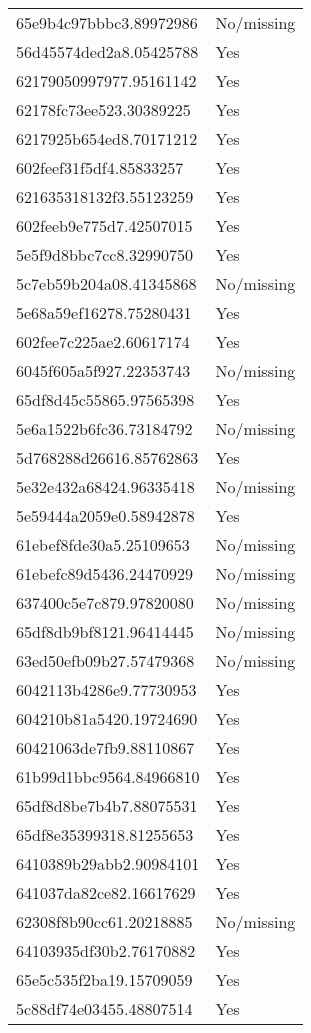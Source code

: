 \begin{tabular}{ll}
65e9b4c97bbbc3.89972986 & No/missing \\
56d45574ded2a8.05425788 & Yes \\
62179050997977.95161142 & Yes \\
62178fc73ee523.30389225 & Yes \\
6217925b654ed8.70171212 & Yes \\
602feef31f5df4.85833257 & Yes \\
621635318132f3.55123259 & Yes \\
602feeb9e775d7.42507015 & Yes \\
5e5f9d8bbc7cc8.32990750 & Yes \\
5c7eb59b204a08.41345868 & No/missing \\
5e68a59ef16278.75280431 & Yes \\
602fee7c225ae2.60617174 & Yes \\
6045f605a5f927.22353743 & No/missing \\
65df8d45c55865.97565398 & Yes \\
5e6a1522b6fc36.73184792 & No/missing \\
5d768288d26616.85762863 & Yes \\
5e32e432a68424.96335418 & No/missing \\
5e59444a2059e0.58942878 & Yes \\
61ebef8fde30a5.25109653 & No/missing \\
61ebefc89d5436.24470929 & No/missing \\
637400c5e7c879.97820080 & No/missing \\
65df8db9bf8121.96414445 & No/missing \\
63ed50efb09b27.57479368 & No/missing \\
6042113b4286e9.77730953 & Yes \\
604210b81a5420.19724690 & Yes \\
60421063de7fb9.88110867 & Yes \\
61b99d1bbc9564.84966810 & Yes \\
65df8d8be7b4b7.88075531 & Yes \\
65df8e35399318.81255653 & Yes \\
6410389b29abb2.90984101 & Yes \\
641037da82ce82.16617629 & Yes \\
62308f8b90cc61.20218885 & No/missing \\
64103935df30b2.76170882 & Yes \\
65e5c535f2ba19.15709059 & Yes \\
5c88df74e03455.48807514 & Yes \\

\end{tabular}
